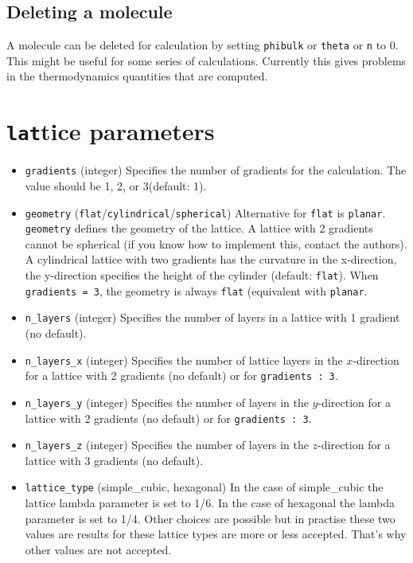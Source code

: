 \documentclass{article}
\begin{document}
\subsection{Deleting a molecule}
\label{sec:deletemolecule}
A molecule can be deleted for calculation by setting {\tt phibulk} or {\tt theta} or {\tt n} to 0. This might be useful for some series of calculations. Currently this gives problems in the thermodynamics quantities that are computed. %

\section{{\tt lat}tice parameters}
\label{sec:lattice}
\begin{itemize}

\item {\tt gradients} (integer) Specifies the number of gradients for the calculation.  The value should be 1,  2, or 3(default: 1). 

\item {\tt geometry} ({\tt flat}/{\tt cylindrical}/{\tt spherical}) Alternative for {\tt flat} is {\tt planar}. {\tt geometry} defines the geometry of the lattice.  A lattice with 2 gradients cannot be spherical (if you know how to implement this, contact the authors).  A cylindrical lattice with two gradients has the curvature in the x-direction, the y-direction specifies the height of the cylinder (default: {\tt flat}). When {\tt gradients = 3}, the geometry is always {\tt flat} (equivalent with {\tt planar}. 

\item {\tt n\_layers} (integer) Specifies the number of layers in a lattice with 1 gradient (no default).

\item {\tt n\_layers\_x} (integer) Specifies the number of lattice layers in the $x$-direction for a lattice with 2 gradients (no default) or for {\tt gradients : 3}.

\item {\tt n\_layers\_y} (integer) Specifies the number of layers in the $y$-direction for a lattice with 2 gradients (no default) or for {\tt gradients : 3}.

\item {\tt n\_layers\_z} (integer) Specifies the number of layers in  the $z$-direction for a lattice with 3 gradients (no default).

\item {\tt lattice\_type} (simple\_cubic, hexagonal) In the case of simple\_cubic the lattice lambda parameter is set to 1/6. In the case of hexagonal the lambda parameter is set to 1/4. Other choices are possible but in practise these two values are results for these lattice types are more or less accepted. That's why other values are not accepted.


\end{itemize}
\end{document}
